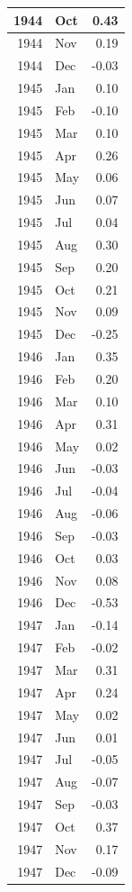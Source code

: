 \documentclass[
]{article}
\begin{document}
\begin{table}[H]
\begin{tabular}[t]{r|l|r}
\hline
1944 & Oct & 0.43\\
\hline
1944 & Nov & 0.19\\
\hline
1944 & Dec & -0.03\\
\hline
1945 & Jan & 0.10\\
\hline
1945 & Feb & -0.10\\
\hline
1945 & Mar & 0.10\\
\hline
1945 & Apr & 0.26\\
\hline
1945 & May & 0.06\\
\hline
1945 & Jun & 0.07\\
\hline
1945 & Jul & 0.04\\
\hline
1945 & Aug & 0.30\\
\hline
1945 & Sep & 0.20\\
\hline
1945 & Oct & 0.21\\
\hline
1945 & Nov & 0.09\\
\hline
1945 & Dec & -0.25\\
\hline
1946 & Jan & 0.35\\
\hline
1946 & Feb & 0.20\\
\hline
1946 & Mar & 0.10\\
\hline
1946 & Apr & 0.31\\
\hline
1946 & May & 0.02\\
\hline
1946 & Jun & -0.03\\
\hline
1946 & Jul & -0.04\\
\hline
1946 & Aug & -0.06\\
\hline
1946 & Sep & -0.03\\
\hline
1946 & Oct & 0.03\\
\hline
1946 & Nov & 0.08\\
\hline
1946 & Dec & -0.53\\
\hline
1947 & Jan & -0.14\\
\hline
1947 & Feb & -0.02\\
\hline
1947 & Mar & 0.31\\
\hline
1947 & Apr & 0.24\\
\hline
1947 & May & 0.02\\
\hline
1947 & Jun & 0.01\\
\hline
1947 & Jul & -0.05\\
\hline
1947 & Aug & -0.07\\
\hline
1947 & Sep & -0.03\\
\hline
1947 & Oct & 0.37\\
\hline
1947 & Nov & 0.17\\
\hline
1947 & Dec & -0.09\\

\end{tabular}
\end{table}
\end{document}
